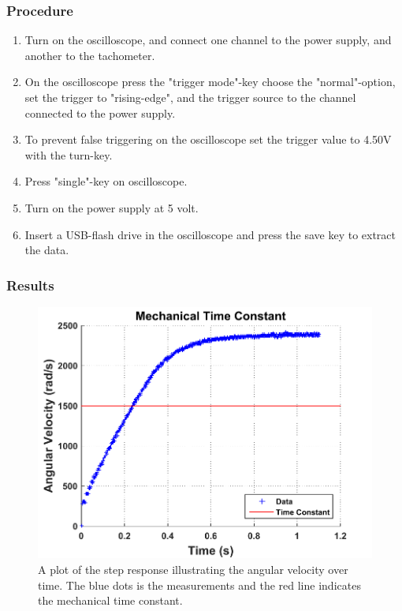 \subsubsection{Procedure}

\begin{enumerate}
  \item Turn on the oscilloscope, and connect one channel to the power supply, and another to the tachometer.
  \item On the oscilloscope press the "trigger mode"-key choose the "normal"-option, set the trigger to "rising-edge", and the trigger source to the channel connected to the power supply.
  \item To prevent false triggering on the oscilloscope set the trigger value to \num{4,50}V with the turn-key.
  \item Press "single"-key on oscilloscope.
  \item Turn on the power supply at 5 volt.
  \item Insert a USB-flash drive in the oscilloscope and press the save key to extract the data.
\end{enumerate}

\subsubsection{Results}

\begin{figure}[H]
  \centering
  \includegraphics[width=.8\textwidth]{figures/mechanicalTimeConstant.pdf}
	\caption{A plot of the step response illustrating the angular velocity over time. The blue dots is the measurements and the red line indicates the mechanical time constant.}
	\label{mechanicalTimeConstant}
\end{figure}

